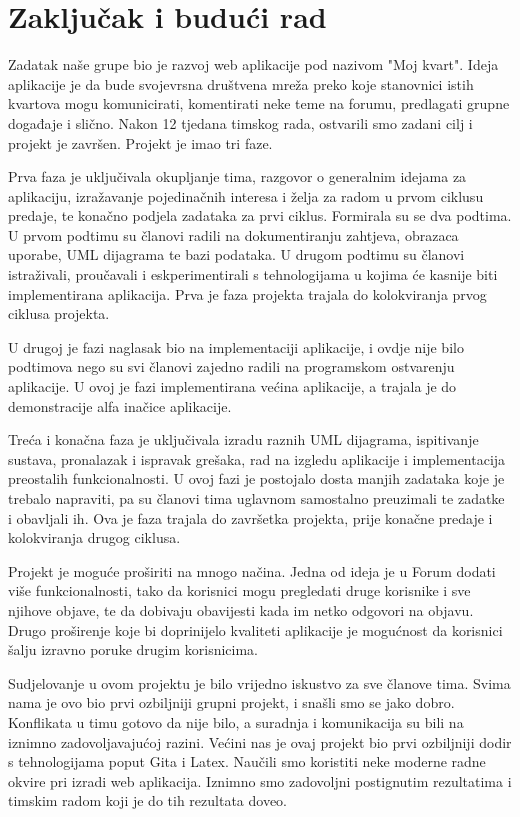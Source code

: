 \chapter{Zaključak i budući rad}
		
		Zadatak naše grupe bio je razvoj web aplikacije pod nazivom "Moj kvart". Ideja aplikacije je da bude svojevrsna društvena mreža preko koje stanovnici istih kvartova mogu komunicirati, komentirati neke teme na forumu, predlagati grupne događaje i slično. Nakon 12 tjedana timskog rada, ostvarili smo zadani cilj i projekt je završen. Projekt je imao tri faze.
		
		Prva faza je uključivala okupljanje tima, razgovor o generalnim idejama za aplikaciju, izražavanje pojedinačnih interesa i želja za radom u prvom ciklusu predaje, te konačno podjela zadataka za prvi ciklus. Formirala su se dva podtima. U prvom podtimu su članovi radili na dokumentiranju zahtjeva, obrazaca uporabe, UML dijagrama te bazi podataka. U drugom podtimu su članovi istraživali, proučavali i eskperimentirali s tehnologijama u kojima će kasnije biti implementirana aplikacija. Prva je faza projekta trajala do kolokviranja prvog ciklusa projekta.
		
		U drugoj je fazi naglasak bio na implementaciji aplikacije, i ovdje nije bilo podtimova nego su svi članovi zajedno radili na programskom ostvarenju aplikacije. U ovoj je fazi implementirana većina aplikacije, a trajala je do demonstracije alfa inačice aplikacije.
		
		Treća i konačna faza je uključivala izradu raznih UML dijagrama, ispitivanje sustava, pronalazak i ispravak grešaka, rad na izgledu aplikacije i implementacija preostalih funkcionalnosti. U ovoj fazi je postojalo dosta manjih zadataka koje je trebalo napraviti, pa su članovi tima uglavnom samostalno preuzimali te zadatke i obavljali ih. Ova je faza trajala do završetka projekta, prije konačne predaje i kolokviranja drugog ciklusa.
		
		Projekt je moguće proširiti na mnogo načina. Jedna od ideja je u Forum dodati više funkcionalnosti, tako da korisnici mogu pregledati druge korisnike i sve njihove objave, te da dobivaju obavijesti kada im netko odgovori na objavu. Drugo proširenje koje bi doprinijelo kvaliteti aplikacije je mogućnost da korisnici šalju izravno poruke drugim korisnicima.
		
		Sudjelovanje u ovom projektu je bilo vrijedno iskustvo za sve članove tima. Svima nama je ovo bio prvi ozbiljniji grupni projekt, i snašli smo se jako dobro. Konflikata u timu gotovo da nije bilo, a suradnja i komunikacija su bili na iznimno zadovoljavajućoj razini. Većini nas je ovaj projekt bio prvi ozbiljniji dodir s tehnologijama poput Gita i Latex. Naučili smo koristiti neke moderne radne okvire pri izradi web aplikacija. Iznimno smo zadovoljni postignutim rezultatima i timskim radom koji je do tih rezultata doveo.
		
		\eject 